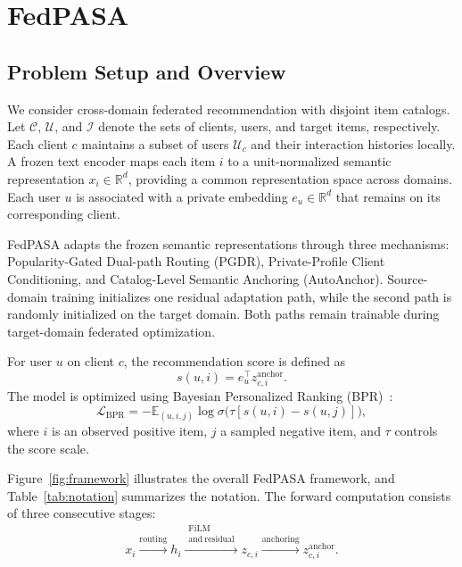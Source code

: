 \section{FedPASA}
\label{sec:method}

\subsection{Problem Setup and Overview}
\label{sec:setup}

We consider cross-domain federated recommendation with disjoint item catalogs. Let $\mathcal{C}$, $\mathcal{U}$, and $\mathcal{I}$ denote the sets of clients, users, and target items, respectively. Each client $c$ maintains a subset of users $\mathcal{U}_c$ and their interaction histories locally. A frozen text encoder maps each item $i$ to a unit-normalized semantic representation $x_i\in\mathbb{R}^d$, providing a common representation space across domains. Each user $u$ is associated with a private embedding $e_u\in\mathbb{R}^d$ that remains on its corresponding client.

FedPASA adapts the frozen semantic representations through three mechanisms: Popularity-Gated Dual-path Routing (PGDR), Private-Profile Client Conditioning, and Catalog-Level Semantic Anchoring (AutoAnchor). Source-domain training initializes one residual adaptation path, while the second path is randomly initialized on the target domain. Both paths remain trainable during target-domain federated optimization.

For user $u$ on client $c$, the recommendation score is defined as
\begin{equation}
    s(u,i)=e_u^{\top}z^{\mathrm{anchor}}_{c,i}.
    \label{eq:score}
\end{equation}
The model is optimized using Bayesian Personalized Ranking (BPR)~\citep{rendle2009bpr}:
\[
\mathcal{L}_{\mathrm{BPR}}=-\mathbb{E}_{(u,i,j)}\log\sigma\big(\tau[s(u,i)-s(u,j)]\big),
\]
where $i$ is an observed positive item, $j$ a sampled negative item, and $\tau$ controls the score scale.

Figure~\ref{fig:framework} illustrates the overall FedPASA framework, and Table~\ref{tab:notation} summarizes the notation. The forward computation consists of three consecutive stages:
\begin{equation}
x_i \xrightarrow{\mathrm{routing}} h_i
\xrightarrow{\substack{\mathrm{FiLM}\\\mathrm{and\ residual}}} z_{c,i}
\xrightarrow{\mathrm{anchoring}} z^{\mathrm{anchor}}_{c,i}.
\label{eq:pipeline}
\end{equation}

